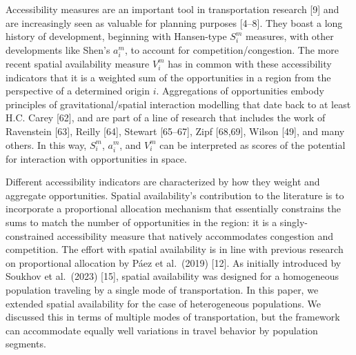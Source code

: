 \documentclass[10pt,letterpaper]{article}
\begin{document}
Accessibility measures are an important tool in transportation research
{[}9{]} and are increasingly seen as valuable for planning purposes
{[}4--8{]}. They boast a long history of development, beginning with
Hansen-type \(S_i^m\) measures, with other developments like Shen's
\(a_i^m\), to account for competition/congestion. The more recent
spatial availability measure \(V_i^m\) has in common with these
accessibility indicators that it is a weighted sum of the opportunities
in a region from the perspective of a determined origin \(i\).
Aggregations of opportunities embody principles of gravitational/spatial
interaction modelling that date back to at least H.C. Carey {[}62{]},
and are part of a line of research that includes the work of Ravenstein
{[}63{]}, Reilly {[}64{]}, Stewart {[}65--67{]}, Zipf {[}68,69{]},
Wilson {[}49{]}, and many others. In this way, \(S_i^m\), \(a_i^m\), and
\(V_i^m\) can be interpreted as scores of the potential for interaction
with opportunities in space.

Different accessibility indicators are characterized by how they weight
and aggregate opportunities. Spatial availability's contribution to the
literature is to incorporate a proportional allocation mechanism that
essentially constrains the sums to match the number of opportunities in
the region: it is a singly-constrained accessibility measure that
natively accommodates congestion and competition. The effort with
spatial availability is in line with previous research on proportional
allocation by Páez et al.~(2019) {[}12{]}. As initially introduced by
Soukhov et al.~(2023) {[}15{]}, spatial availability was designed for a
homogeneous population traveling by a single mode of transportation. In
this paper, we extended spatial availability for the case of
heterogeneous populations. We discussed this in terms of multiple modes
of transportation, but the framework can accommodate equally well
variations in travel behavior by population segments.
\end{document}
